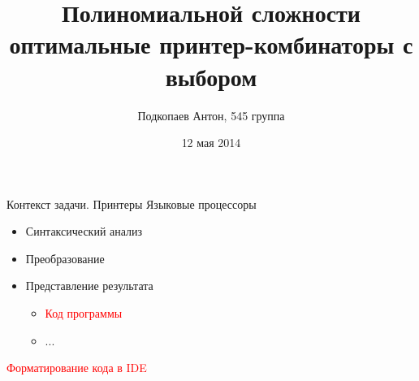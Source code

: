 \documentclass[sans]{beamer}
\begin{document}
\title
[PTOPPCC]
{Полиномиальной сложности оптимальные принтер-комбинаторы с выбором}
\author
[Подкопаев Антон]
{Подкопаев Антон, 545 группа}
\date [12-05-14]{12 мая 2014}

\begin{frame}[plain]
	\titlepage
\end{frame}

\begin{frame}{Контекст задачи. Принтеры}
	Языковые процессоры

	\begin{block}{}
		\begin{itemize}
			\item Синтаксический анализ
			\item Преобразование
			\item Представление результата
			\begin{itemize}
				\item \textcolor{red}{Код программы}
				\item ...
			\end{itemize}
		\end{itemize}
	\end{block}
  
  \textcolor{red}{Форматирование кода в IDE}
\end{frame}
\end{document}

